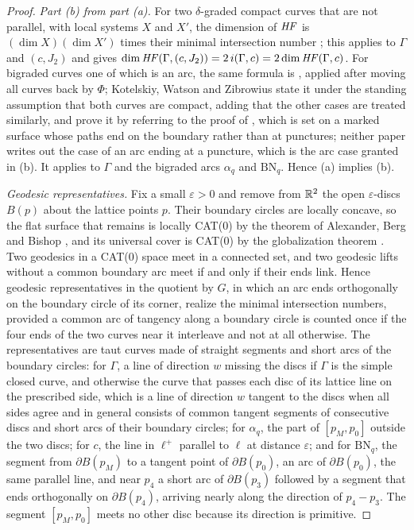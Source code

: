 \begin{proof}
\emph{Part (b) from part (a).}  For two $\delta$-graded compact curves that are not parallel, with
local systems $X$ and $X'$, the dimension of $\mathit{HF}$ is $(\dim X)(\dim X')$ times their minimal
intersection number \cite[Thm.~4.45]{Zibrowius}; this applies to $\Gamma$ and $(c,J_2)$ and gives
$\dim\mathit{HF}(\Gamma,(c,J_2))=2\,i(\Gamma,c)=2\dim\mathit{HF}(\Gamma,c)$.  For bigraded curves one of which is an arc, the same
formula is \cite[Thm.~5.25]{KWZ}, applied after moving all curves back by $\Phi$; Kotelskiy, Watson
and Zibrowius state it under the standing assumption that both curves are compact, adding that the other
cases are treated similarly, and prove it by referring to the proof of \cite[Thm.~4.45]{Zibrowius}, which
is set on a marked surface whose paths end on the boundary rather than at punctures; neither paper writes
out the case of an arc ending at a puncture, which is the arc case granted in (b).  It applies to
$\Gamma$ and the bigraded arcs $\alpha_q$ and $\mathrm{BN}_q$.  Hence (a) implies (b).

\emph{Geodesic representatives.}  Fix a small $\varepsilon>0$ and remove from $\mathbb{R}^2$ the open
$\varepsilon$-discs $B(p)$ about the lattice points $p$.  Their boundary circles are locally
concave, so the flat surface that remains is locally CAT(0) by the theorem of Alexander, Berg and
Bishop \cite[Thm.~7.28]{AKP}, and its universal cover is CAT(0) by the globalization theorem
\cite[Thm.~5.6]{AKP}.  Two geodesics in a CAT(0) space meet in a connected set, and two geodesic lifts without a common boundary arc meet
if and only if their ends link.  Hence geodesic
representatives in the quotient by $G$, in which an arc ends orthogonally on the boundary circle of its corner,
realize the minimal intersection numbers, provided a common arc of tangency along a boundary circle
is counted once if the four ends of the two curves near it interleave and not at all otherwise.  The
representatives are taut curves made of straight segments and short arcs of the boundary circles: for
$\Gamma$, a line of direction $w$ missing the discs if $\Gamma$ is the simple closed curve, and otherwise the curve that
passes each disc of its lattice line on the prescribed side, which is a line of direction $w$ tangent to the
discs when all sides agree and in general consists of common tangent segments of consecutive discs and short
arcs of their boundary circles; for $\alpha_q$, the part of $[p_M,p_0]$ outside the two
discs; for $c$, the line in $\ell^+$ parallel to $\ell$ at distance $\varepsilon$; and for $\mathrm{BN}_q$, the
segment from $\partial B(p_M)$ to a tangent point of $\partial B(p_0)$, an arc of $\partial B(p_0)$, the same
parallel line, and near $p_4$ a short arc of $\partial B(p_3)$ followed by a segment that ends orthogonally on
$\partial B(p_4)$, arriving nearly along the direction of $p_4-p_3$.  The segment $[p_M,p_0]$ meets no other
disc because its direction is primitive.


\end{proof}
